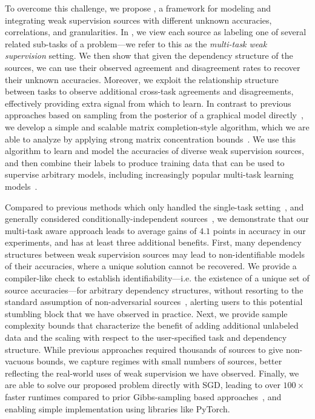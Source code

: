 \documentclass[letterpaper]{article}
\begin{document}
To overcome this challenge, we propose \systemx, a framework for modeling and integrating weak supervision sources with different unknown accuracies, correlations, and granularities.
In \systemx, we view each source as labeling one of several related sub-tasks of a problem---we refer to this as the \textit{multi-task weak supervision} setting.
We then show that given the dependency structure of the sources, we can use their observed agreement and disagreement rates to recover their unknown accuracies.
Moreover, we exploit the relationship structure between tasks to observe additional cross-task agreements and disagreements, effectively providing extra signal from which to learn.
In contrast to previous approaches based on sampling from the posterior of a graphical model directly~\cite{ratner2016data,bach2017learning}, we develop a simple and scalable matrix completion-style algorithm, which we are able to analyze by applying strong matrix concentration bounds~\cite{tropp2015introduction}.
We use this algorithm to learn and model the accuracies of diverse weak supervision sources, and then combine their labels to produce training data that can be used to supervise arbitrary models, including increasingly popular multi-task learning models~\cite{Caruana93multitasklearning,DBLP:journals/corr/Ruder17a}.

Compared to previous methods which only handled the single-task setting~\cite{ratner2016data,ratner2018snorkel}, and generally considered conditionally-independent sources~\cite{anandkumar2014tensor,dawid1979maximum}, we demonstrate that our multi-task aware approach leads to average gains of $4.1$ points in accuracy in our experiments, and has at least three additional benefits.
First, many dependency structures between weak supervision sources may lead to non-identifiable models of their accuracies, where a unique solution cannot be recovered.
We provide a compiler-like check to establish identifiability---i.e. the existence of a unique set of source accuracies---for arbitrary dependency structures, without resorting to the standard assumption of non-adversarial sources~\cite{dawid1979maximum}, alerting users to this potential stumbling block that we have observed in practice.
Next, we provide sample complexity bounds that characterize the benefit of adding additional unlabeled data and the scaling with respect to the user-specified task and dependency structure.
While previous approaches required thousands of sources to give non-vacuous bounds, we capture regimes with small numbers of sources, better reflecting the real-world uses of weak supervision we have observed.
Finally, we are able to solve our proposed problem directly with SGD, leading to over $100\times$ faster runtimes compared to prior Gibbs-sampling based approaches~\cite{ratner2016data,platanios2017estimating}, and enabling simple implementation using libraries like PyTorch.
\end{document}
